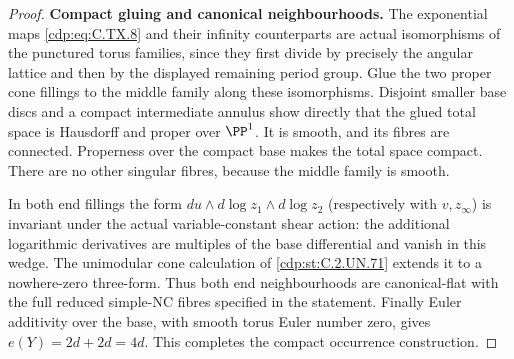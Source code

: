 \begin{proof}
\par\medskip\noindent\textbf{Compact gluing and canonical neighbourhoods.}
The exponential maps \eqref{cdp:eq:C.TX.8} and
their infinity counterparts are
actual isomorphisms of the
punctured torus families, since
they first divide by precisely
the angular lattice and then
by the displayed remaining
period group. Glue the two
proper cone fillings to the
middle family along these
isomorphisms. Disjoint smaller
base discs and a compact
intermediate annulus show
directly that the glued total
space is Hausdorff and proper
over $\PP^1$. It is smooth,
and its fibres are connected.
Properness over the compact
base makes the total space
compact. There are no other
singular fibres, because the
middle family is smooth.

In both end fillings the form
$du\wedge d\log z_1\wedge d\log z_2$
(respectively with $v,z_\infty$)
is invariant under the actual
variable-constant shear action:
the additional logarithmic
derivatives are multiples of
the base differential and
vanish in this wedge. The
unimodular cone calculation
of \ref{cdp:st:C.2.UN.71} extends it to a
nowhere-zero three-form.
Thus both end neighbourhoods
are canonical-flat with the
full reduced simple-NC
fibres specified in the
statement. Finally Euler
additivity over the base,
with smooth torus Euler
number zero, gives
$e(Y)=2d+2d=4d$.
This completes the compact
occurrence construction.
\end{proof}


